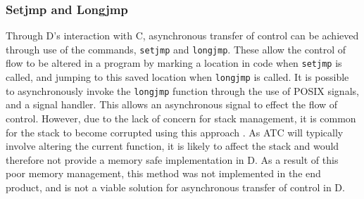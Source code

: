 \subsubsection*{Setjmp and Longjmp} 
Through D's interaction with C, asynchronous transfer of control can be achieved 
through use of the commands, \texttt{setjmp} and \texttt{longjmp}. These allow 
the control of flow to be altered in a program by marking a location in code when 
\texttt{setjmp} is called, and jumping to this saved location when \texttt{longjmp} 
is called. It is possible to asynchronously invoke the \texttt{longjmp} function
through the use of POSIX signals, and a signal handler. This allows an asynchronous 
signal to effect the flow of control. However, due to the lack of concern for 
stack management, it is common for the stack to become corrupted using this approach
\cite{unwinding-stack}. As ATC will typically involve altering the current function, 
it is likely to affect the stack and would therefore not provide a memory safe 
implementation in D. As a result of this poor memory management, this method was 
not implemented in the end product, and is not a viable solution for asynchronous 
transfer of control in D. 


